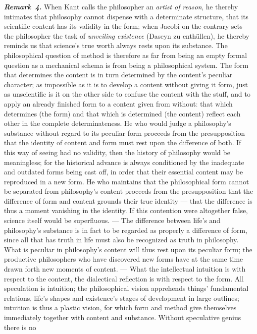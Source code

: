 \documentclass[12pt]{book}
\newcommand{\anm}[1]{\emph{\textbf{Remark~#1.}}}
\begin{document}
\anm{4} When Kant calls the philosopher an \emph{artist of reason}, he
thereby intimates that philosophy cannot dispense with a determinate
structure, that its scientific content has its validity in the form; when
Jacobi on the contrary sets the philosopher the task of \emph{unveiling
existence} (Daseyn zu enthüllen), he thereby reminds us that science's true
worth always rests upon its substance. The philosophical question of method
is therefore as far from being an empty formal question as a mechanical
schema is from being a philosophical system. The form that determines the
content is in turn determined by the content's peculiar character; as
impossible as it is to develop a content without giving it form, just as
unscientific is it on the other side to confuse the content with the stuff,
and to apply an already finished form to a content given from without: that
which determines (the form) and that which is determined (the content)
reflect each other in the complete determinateness. He who would judge a
philosophy's substance without regard to its peculiar form proceeds from the
presupposition that the identity of content and form must rest upon the
difference of both. If this way of seeing had no validity, then the history
of philosophy would be meaningless; for the historical advance is always
conditioned by the inadequate and outdated forms being cast off, in order
that their essential content may be reproduced in a new form. He who
maintains that the philosophical form cannot be separated from philosophy's
content proceeds from the presupposition that the difference of form and
content grounds their true identity --- that the difference is thus a
moment vanishing in the identity. If this contention were altogether false,
science itself would be superfluous. --- The difference between life's and
philosophy's substance is in fact to be regarded as properly a difference of
form, since all that has truth in life must also be recognized as truth in
philosophy. What is peculiar in philosophy's content will thus rest upon its
peculiar form; the productive philosophers who have discovered new forms
have at the same time drawn forth new moments of content. --- What the
intellectual intuition is with respect to the content, the dialectical
reflection is with respect to the form. All speculation is intuition; the
philosophical vision apprehends things' fundamental relations, life's
shapes and existence's stages of development in large outlines; intuition is
thus a plastic vision, for which form and method give themselves immediately
together with content and substance. Without speculative genius there is no
\end{document}
